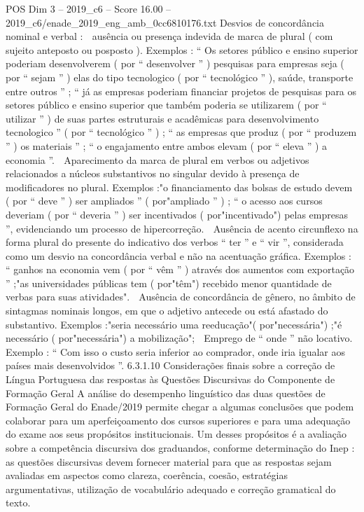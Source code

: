 \begin{textsample}{POS Dim 3 – 2019\_c6 – Score 16.00 – 2019\_c6/enade\_2019\_eng\_amb\_0cc6810176.txt}
Desvios de concordância nominal e verbal :  ausência ou presença indevida de marca de plural ( com sujeito anteposto ou posposto ).
Exemplos : “ Os setores público e ensino superior poderiam desenvolverem ( por “ desenvolver ” ) pesquisas para empresas seja ( por “ sejam ” ) elas do tipo tecnologico ( por “ tecnológico ” ), saúde, transporte entre outros ” ; “ já as empresas poderiam financiar projetos de pesquisas para os setores público e ensino superior que também poderia se utilizarem ( por “ utilizar ” ) de suas partes estruturais e acadêmicas para desenvolvimento tecnologico ” ( por “ tecnológico ” ) ; “ as empresas que produz ( por “ produzem ” ) os materiais ” ; “ o engajamento entre ambos elevam ( por “ eleva ” ) a economia ”.  Aparecimento da marca de plural em verbos ou adjetivos relacionados a núcleos substantivos no singular devido à presença de modificadores no plural.
Exemplos :"o financiamento das bolsas de estudo devem ( por “ deve ” ) ser ampliados ” ( por"ampliado ” ) ; “ o acesso aos cursos deveriam ( por “ deveria ” ) ser incentivados ( por"incentivado") pelas empresas ”, evidenciando um processo de hipercorreção.  Ausência de acento circunflexo na forma plural do presente do indicativo dos verbos “ ter ” e “ vir ”, considerada como um desvio na concordância verbal e não na acentuação gráfica.
Exemplos : “ ganhos na economia vem ( por “ vêm ” ) através dos aumentos com exportação ” ;"as universidades públicas tem ( por"têm") recebido menor quantidade de verbas para suas atividades".  Ausência de concordância de gênero, no âmbito de sintagmas nominais longos, em que o adjetivo antecede ou está afastado do substantivo.
Exemplos :"seria necessário uma reeducação"( por"necessária") ;"é necessário ( por"necessária") a mobilização";  Emprego de “ onde ” não locativo.
Exemplo : “ Com isso o custo seria inferior ao comprador, onde iria igualar aos países mais desenvolvidos ”. 6.3.1.10 Considerações finais sobre a correção de Língua Portuguesa das respostas às Questões Discursivas do Componente de Formação Geral A análise do desempenho linguístico das duas questões de Formação Geral do Enade/2019 permite chegar a algumas conclusões que podem colaborar para um aperfeiçoamento dos cursos superiores e para uma adequação do exame aos seus propósitos institucionais.
Um desses propósitos é a avaliação sobre a competência discursiva dos graduandos, conforme determinação do Inep : as questões discursivas devem fornecer material para que as respostas sejam avaliadas em aspectos como clareza, coerência, coesão, estratégias argumentativas, utilização de vocabulário adequado e correção gramatical do texto.

\end{textsample}
